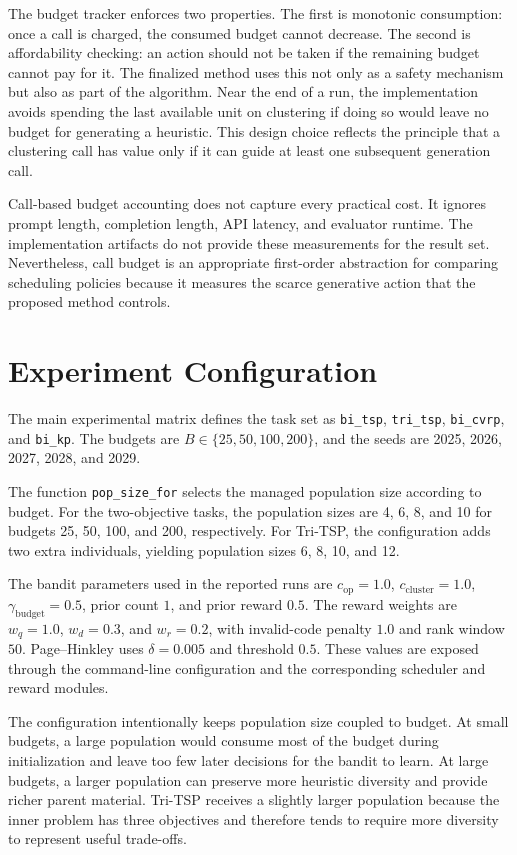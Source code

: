 \documentclass[../main.tex]{subfiles}
\begin{document}
The budget tracker enforces two properties. The first is monotonic consumption: once a call is charged, the consumed budget cannot decrease. The second is affordability checking: an action should not be taken if the remaining budget cannot pay for it. The finalized method uses this not only as a safety mechanism but also as part of the algorithm. Near the end of a run, the implementation avoids spending the last available unit on clustering if doing so would leave no budget for generating a heuristic. This design choice reflects the principle that a clustering call has value only if it can guide at least one subsequent generation call.

Call-based budget accounting does not capture every practical cost. It ignores prompt length, completion length, API latency, and evaluator runtime. The implementation artifacts do not provide these measurements for the result set. Nevertheless, call budget is an appropriate first-order abstraction for comparing scheduling policies because it measures the scarce generative action that the proposed method controls.

\section{Experiment Configuration}

The main experimental matrix defines the task set as \texttt{bi\_tsp}, \texttt{tri\_tsp}, \texttt{bi\_cvrp}, and \texttt{bi\_kp}. The budgets are $B \in \{25,50,100,200\}$, and the seeds are 2025, 2026, 2027, 2028, and 2029.

The function \texttt{pop\_size\_for} selects the managed population size according to budget. For the two-objective tasks, the population sizes are 4, 6, 8, and 10 for budgets 25, 50, 100, and 200, respectively. For Tri-TSP, the configuration adds two extra individuals, yielding population sizes 6, 8, 10, and 12.

The bandit parameters used in the reported runs are $c_{\mathrm{op}}=1.0$, $c_{\mathrm{cluster}}=1.0$, $\gamma_{\mathrm{budget}}=0.5$, prior count $1$, and prior reward $0.5$. The reward weights are $w_q=1.0$, $w_d=0.3$, and $w_r=0.2$, with invalid-code penalty $1.0$ and rank window $50$. Page--Hinkley uses $\delta=0.005$ and threshold $0.5$. These values are exposed through the command-line configuration and the corresponding scheduler and reward modules.

The configuration intentionally keeps population size coupled to budget. At small budgets, a large population would consume most of the budget during initialization and leave too few later decisions for the bandit to learn. At large budgets, a larger population can preserve more heuristic diversity and provide richer parent material. Tri-TSP receives a slightly larger population because the inner problem has three objectives and therefore tends to require more diversity to represent useful trade-offs.
\end{document}
